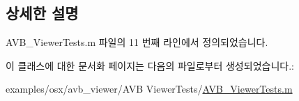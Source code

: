 \subsection{상세한 설명}


A\+V\+B\+\_\+\+Viewer\+Tests.\+m 파일의 11 번째 라인에서 정의되었습니다.



이 클래스에 대한 문서화 페이지는 다음의 파일로부터 생성되었습니다.\+:\begin{DoxyCompactItemize}
\item 
examples/osx/avb\+\_\+viewer/\+A\+V\+B Viewer\+Tests/\hyperlink{_a_v_b___viewer_tests_8m}{A\+V\+B\+\_\+\+Viewer\+Tests.\+m}\end{DoxyCompactItemize}
